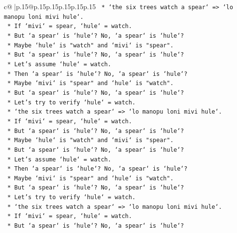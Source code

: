 \documentclass{article}
\begin{document}
{\begin{supertabular}{c@{$\;$}|p{.15\linewidth}@{}p{.15\linewidth}p{.15\linewidth}p{.15\linewidth}p{.15\linewidth}p{.15\linewidth}}
{{{\texttt{                *   `the six trees watch a spear` => `lo manopu loni mivi hule`.} \\
\texttt{                *   If `mivi` = spear, `hule` = watch.} \\
\texttt{                *   But `a spear` is `hule`? No, `a spear` is `hule`?} \\
\texttt{                *   Maybe `hule` is "watch" and `mivi` is "spear".} \\
\texttt{                *   But `a spear` is `hule`? No, `a spear` is `hule`?} \\
\texttt{                *   Let's assume `hule` = watch.} \\
\texttt{                *   Then `a spear` is `hule`? No, `a spear` is `hule`?} \\
\texttt{                *   Maybe `mivi` is "spear" and `hule` is "watch".} \\
\texttt{                *   But `a spear` is `hule`? No, `a spear` is `hule`?} \\
\texttt{                *   Let's try to verify `hule` = watch.} \\
\texttt{                *   `the six trees watch a spear` => `lo manopu loni mivi hule`.} \\
\texttt{                *   If `mivi` = spear, `hule` = watch.} \\
\texttt{                *   But `a spear` is `hule`? No, `a spear` is `hule`?} \\
\texttt{                *   Maybe `hule` is "watch" and `mivi` is "spear".} \\
\texttt{                *   But `a spear` is `hule`? No, `a spear` is `hule`?} \\
\texttt{                *   Let's assume `hule` = watch.} \\
\texttt{                *   Then `a spear` is `hule`? No, `a spear` is `hule`?} \\
\texttt{                *   Maybe `mivi` is "spear" and `hule` is "watch".} \\
\texttt{                *   But `a spear` is `hule`? No, `a spear` is `hule`?} \\
\texttt{                *   Let's try to verify `hule` = watch.} \\
\texttt{                *   `the six trees watch a spear` => `lo manopu loni mivi hule`.} \\
\texttt{                *   If `mivi` = spear, `hule` = watch.} \\
\texttt{                *   But `a spear` is `hule`? No, `a spear` is `hule`?} \\
}}}
\end{supertabular}}
\end{document}
